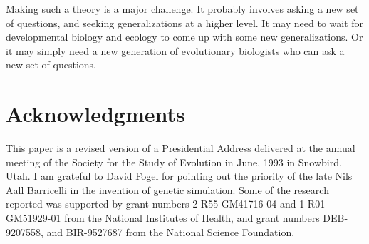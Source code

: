 \documentclass[12pt]{article}
\begin{document}
Making such a theory is a major challenge.  It probably involves asking
a new set of questions, and seeking generalizations at a higher level.  It
may need to wait for developmental biology and ecology to come up with
some new generalizations.  Or it may simply need a new generation of
evolutionary biologists who can ask a new set of questions. 

\section*{Acknowledgments}

This paper is a revised version of a Presidential Address delivered at the
annual meeting of the Society for the Study of Evolution
in June, 1993 in Snowbird, Utah.  I am grateful to David Fogel for
pointing out the priority of the late Nils Aall Barricelli in the invention
of genetic simulation.  Some of the research reported was supported by grant numbers
2 R55 GM41716-04 and 1 R01 GM51929-01 from the National Institutes of Health, and
grant numbers DEB-9207558, and BIR-9527687 from the National Science Foundation.
\end{document}
